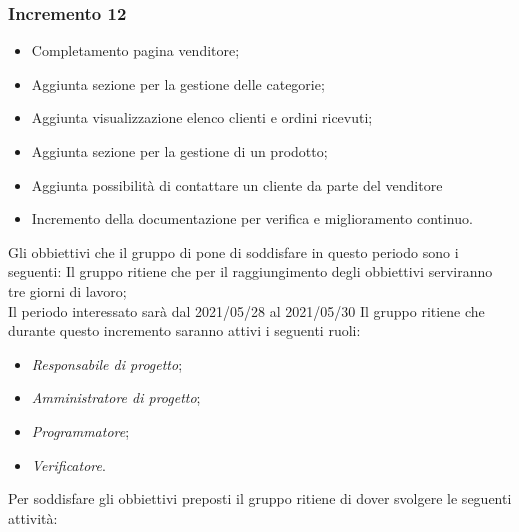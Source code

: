 \subsubsection{Incremento 12}
\begin{itemize}
    \item Completamento pagina venditore;
    \item Aggiunta sezione per la gestione delle categorie;
    \item Aggiunta visualizzazione elenco clienti e ordini ricevuti;
    \item Aggiunta sezione per la gestione di un prodotto;
    \item Aggiunta possibilità di contattare un cliente da parte del venditore
    \item Incremento della documentazione per verifica e miglioramento continuo.
\end{itemize}
Gli obbiettivi che il gruppo di pone di soddisfare in questo periodo sono i seguenti:
Il gruppo ritiene che per il raggiungimento degli obbiettivi serviranno tre giorni di lavoro;\\
Il periodo interessato sarà dal 2021/05/28 al 2021/05/30
Il gruppo ritiene che durante questo incremento saranno attivi i seguenti ruoli:
\begin{itemize}
    \item \textit{Responsabile di progetto};
    \item \textit{Amministratore di progetto};
    \item \textit{Programmatore};
    \item \textit{Verificatore}.
\end{itemize}
Per soddisfare gli obbiettivi preposti il gruppo ritiene di dover svolgere le seguenti attività:
